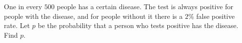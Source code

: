One in every $500$ people has a certain disease. The test is always positive for people with the disease, and for people without it there is a $2\%$ false positive rate. Let $p$ be the probability that a person who tests positive has the disease. Find $p$.
